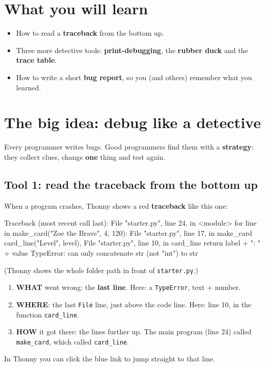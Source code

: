 
\section{What you will learn}
\begin{itemize}[leftmargin=1.2em]
  \item How to read a \textbf{traceback} from the bottom up.
  \item Three more detective tools: \textbf{print-debugging}, the \textbf{rubber duck} and the \textbf{trace table}.
  \item How to write a short \textbf{bug report}, so you (and others) remember what you learned.
\end{itemize}

\section{The big idea: debug like a detective}
Every programmer writes bugs. Good programmers find them with a \textbf{strategy}: they collect clues, change \textbf{one} thing and test again.

\subsection{Tool 1: read the traceback from the bottom up}
When a program crashes, Thonny shows a red \textbf{traceback} like this one:
\begin{outputcode}
Traceback (most recent call last):
  File "starter.py", line 24, in <module>
    for line in make_card("Zoe the Brave", 4, 120):
  File "starter.py", line 17, in make_card
    card_line("Level", level),
  File "starter.py", line 10, in card_line
    return label + ": " + value
TypeError: can only concatenate str (not "int") to str
\end{outputcode}
(Thonny shows the whole folder path in front of \texttt{starter.py}.)
\begin{enumerate}[leftmargin=1.6em]
  \item \textbf{WHAT} went wrong: the \textbf{last line}. Here: a \texttt{TypeError}, text + number.
  \item \textbf{WHERE}: the last \texttt{File} line, just above the code line. Here: line 10, in the function \texttt{card\_line}.
  \item \textbf{HOW} it got there: the lines further up. The main program (line 24) called \texttt{make\_card}, which called \texttt{card\_line}.
\end{enumerate}
In Thonny you can click the blue link to jump straight to that line.

